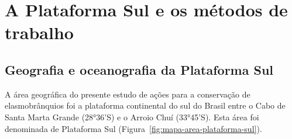\documentclass[a4paper,11pt,twoside,showtrims,onecolumn,openright,final]{memoir}
\begin{document}

%


%




\pagestyle{myheadings}





\chapter{A Plataforma Sul e os métodos de trabalho}\label{chap:metodos}




\newpage

\section*{Geografia e oceanografia da Plataforma Sul}

A área geográfica do presente estudo de ações para a conservação de elasmobrânquios foi 
a plataforma continental do sul do Brasil entre o Cabo de Santa Marta Grande (28°36'S) 
e o Arroio Chuí (33°45'S).  Esta área foi denominada de Plataforma Sul (Figura~\ref{fig:mapa-area-plataforma-sul}).
\end{document}
